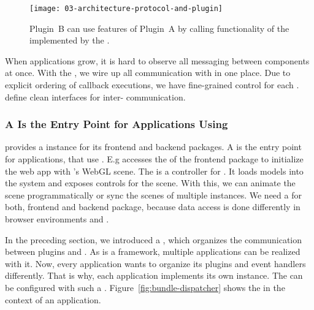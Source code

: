 \documentclass[../../ClassicThesis.tex]{subfiles}
\begin{document}
\begin{figure}[h]
  \centering
  \texttt{[image: 03-architecture-protocol-and-plugin]}
  \caption{Plugin~B can use features of Plugin~A by calling functionality of the  implemented by the .}
  \label{fig:protocol-and-plugin}
\end{figure}

When applications grow, it is hard to observe all messaging between
components at once. With the , we wire up all
communication with  in one place. Due to explicit
ordering of callback executions, we have fine-grained control for each
.  define clean interfaces for
inter- communication.



\subsubsection{A  Is the Entry Point for Applications Using {\convertify}}
\label{sec:bundle-entry-point}

{\convertify} provides a  instance for its frontend and
backend packages. A  is the entry point for
applications, that use {\convertify}. E.g {\platener} accesses the
 of the frontend package to initialize the web app with
{\convertify}'s WebGL scene. The  is a controller for
{\convertify}. It loads models into the system and exposes controls
for the scene. With this, we can animate the scene programmatically or
sync the scenes of multiple {\convertify} instances. We need a
 for both, frontend and backend package, because data
access is done differently in browser environments and {\nodejs}.

In the preceding section, we introduced a , which
organizes the communication between plugins and {\convertify}. As
{\convertify} is a framework, multiple applications can be realized
with it. Now, every application wants to organize its plugins and
event handlers differently. That is why, each application implements
its own  instance. The  can be
configured with such a .
Figure~\ref{fig:bundle-dispatcher} shows the  in the
context of an application.
\end{document}
